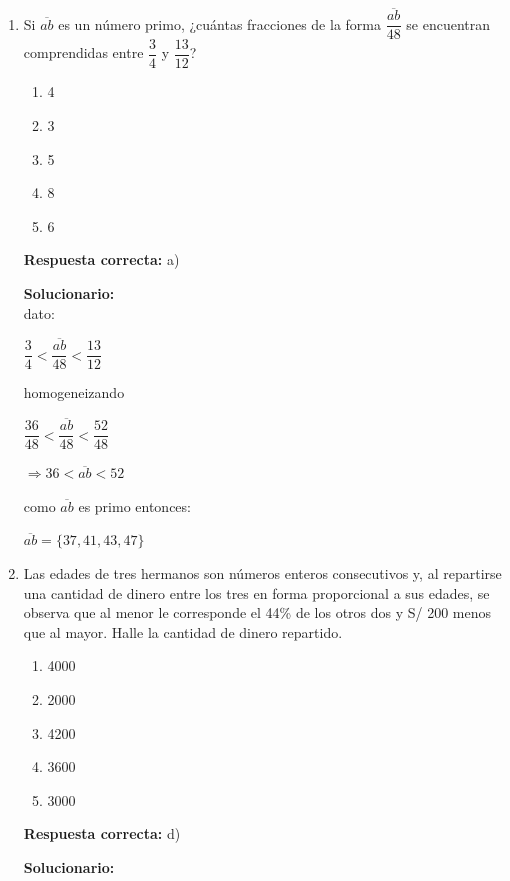 \begin{enumerate}
	
	\item Si $\overline{ab}$ es un número primo, ¿cuántas fracciones de la forma $\dfrac{\overline{ab}}{48}$ se encuentran comprendidas entre $\dfrac{3}{4}$ y $\dfrac{13}{12}$?
	
	\begin{enumerate}[label=\alph*)]
		\item 4
		\item 3
		\item 5
		\item 8
		\item 6
	\end{enumerate}
	\textbf{Respuesta correcta:} a)
	
	\vspace{2mm}
	\textbf{Solucionario:}\\
	
	dato:
	
	$\dfrac{3}{4}<\dfrac{\overline{ab}}{48}<\dfrac{13}{12}$
	
	homogeneizando
	
	$\dfrac{36}{48}<\dfrac{\overline{ab}}{48}<\dfrac{52}{48}$
	
	$\Rightarrow 36<\overline{ab}<52$
	
	como $\overline{ab}$ es primo entonces:
	
	$\overline{ab}=\{37,41,43,47\}$
	
	
	\vspace{6mm}
	
	\item Las edades de tres hermanos son números enteros consecutivos y, al repartirse una cantidad de dinero entre los tres en forma proporcional a sus edades, se observa que al menor le corresponde el 44\% de los otros dos y S/ 200 menos que al mayor. Halle la cantidad de dinero repartido.
	\begin{enumerate}[label=\alph*)]
		\item 4000
		\item 2000
		\item 4200
		\item 3600
		\item 3000
	\end{enumerate}
	\textbf{Respuesta correcta:} d)
	
	\vspace{2mm}
	\textbf{Solucionario:}\\
	

\end{enumerate}
